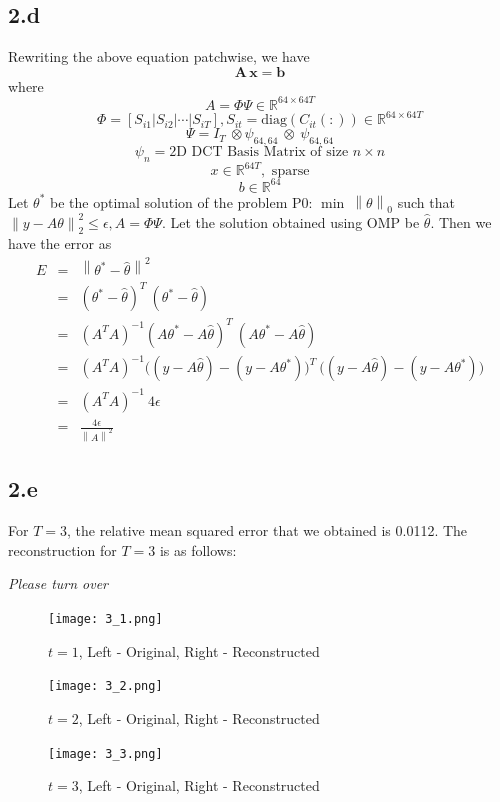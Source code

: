\documentclass[12pt]{article}
\begin{document}
\subsection*{2.d}
Rewriting the above equation patchwise, we have
$$\mathbf{A\,x = b}$$
where
$$A = \Phi \Psi \in \mathbb{R}^{64\times 64T}$$
$$\Phi = [S_{i1}|S_{i2}|\cdots|S_{iT}], S_{it} = \text{diag}(C_{it}(:)) \in \mathbb{R}^{64 \times 64T}$$
$$\Psi = I_{T} \:\otimes \psi_{64,64} \: \otimes\: \psi_{64,64}$$
$$\psi_n = \text{2D DCT Basis Matrix of size } n \times n$$
$$x \in \mathbb{R}^{64T}, \text{ sparse}$$
$$b \in \mathbb{R}^{64}$$
Let $\theta^*$ be the optimal solution of the problem P0: $\min \: \left\lVert\theta\right\rVert_0$ such that $\left \lVert y - A \theta\right \rVert_2^2 \leq \epsilon, A = \Phi \Psi$.
Let the solution obtained using OMP be $\hat{\theta}$. Then we have the error as
\begin{eqnarray*}
E &=& \left \lVert \theta^* - \hat{\theta}\right \rVert^2\\
&=& (\theta^* - \hat{\theta})^T\: (\theta^* - \hat{\theta})\\
&=& (A^TA)^{-1} (A\theta^* - A\hat{\theta})^T \: (A\theta^* - A\hat{\theta})\\
&=& (A^TA)^{-1} \bigg((y - A\hat{\theta}) - (y - A\theta^*)\bigg)^T\: \bigg((y - A\hat{\theta}) - (y - A\theta^*)\bigg)\\
&=& (A^TA)^{-1}\: 4\epsilon\\
&=& \frac{4\epsilon}{\left\lVert A \right \rVert^2}
\end{eqnarray*}
\subsection*{2.e}
For $T=3$, the relative mean squared error that we obtained is 0.0112.
The reconstruction for $T=3$ is as follows:
\vspace{2cm}
\begin{center}
	\textit{Please turn over}
\end{center}
\newpage
\begin{figure}[ht]
	\centering
	\texttt{[image: 3\_1.png]}
	\caption{$t = 1$, Left - Original, Right - Reconstructed}
\end{figure}
\begin{figure}[ht]
	\centering
	\texttt{[image: 3\_2.png]}
	\caption{$t = 2$, Left - Original, Right - Reconstructed}
\end{figure}
\begin{figure}[ht]
	\centering
	\texttt{[image: 3\_3.png]}
	\caption{$t = 3$, Left - Original, Right - Reconstructed}
\end{figure}
\end{document}
